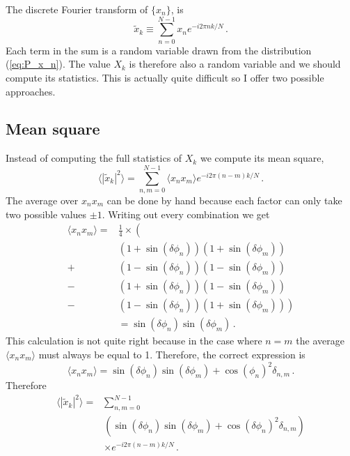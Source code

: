 \documentclass[twocolumn]{article}
\begin{document}
The discrete Fourier transform of $\{ x_n \}$, is
\begin{equation}
\tilde{x}_k \equiv \sum_{n=0}^{N-1} x_n e^{-i 2 \pi n k / N} \, . \label{eq:DFT}
\end{equation}
Each term in the sum is a random variable drawn from the distribution (\ref{eq:P_x_n}).
The value $X_k$ is therefore also a random variable and we should compute its statistics.
This is actually quite difficult so I offer two possible approaches.

\subsection{Mean square}

Instead of computing the full statistics of $X_k$ we compute its mean square,
\begin{equation}
\langle | \tilde{x}_k |^2 \rangle = \sum_{n,m = 0}^{N-1} \langle x_n x_m \rangle e^{-i 2 \pi (n-m) k / N} \, .
\end{equation}
The average over $x_n x_m$ can be done by hand because each factor can only take two possible values $\pm 1$.
Writing out every combination we get
\begin{align}
\langle x_n x_m \rangle = &\frac{1}{4} \times \left( \right. \nonumber \\
  &(1 + \sin(\delta \phi_n))(1 + \sin(\delta \phi_m)) \nonumber \\
+ &(1 - \sin(\delta \phi_n))(1 - \sin(\delta \phi_m)) \nonumber \\
- &(1 + \sin(\delta \phi_n))(1 - \sin(\delta \phi_m)) \nonumber \\
- &(1 - \sin(\delta \phi_n))(1 + \sin(\delta \phi_m)) \left. \right) \nonumber \\
&= \sin(\delta \phi_n)\sin(\delta \phi_m) \, .
\end{align}
This calculation is not quite right because in the case where $n=m$ the average $\langle x_n x_m \rangle$ must always be equal to 1.
Therefore, the correct expression is
\begin{equation}
\langle x_n x_m \rangle = \sin(\delta \phi_n) \sin(\delta \phi_m) + \cos(\phi_n)^2 \delta_{n,m} \, .
\end{equation}
Therefore \begin{align}
\langle |\tilde{x}_k|^2 \rangle = & \sum_{n,m = 0}^{N-1} \nonumber \\
& \left( \sin(\delta \phi_n) \sin(\delta \phi_m) + \cos(\delta \phi_n)^2 \delta_{n,m} \right) \nonumber \\
& \times e^{-i 2 \pi (n-m) k / N} \, .
\end{align}
\end{document}
